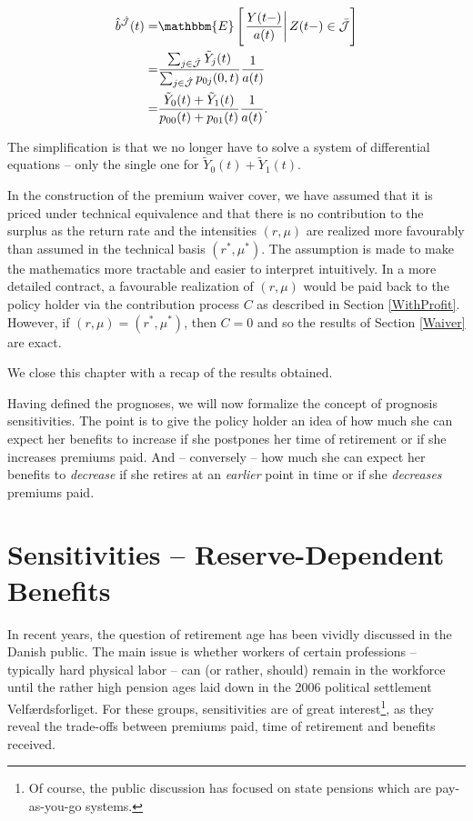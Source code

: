 \documentclass{article}
\newcommand{\1}[1]{\mathbbm{1}_{\left\lbrace #1 \right\rbrace}}
\newcommand{\econd}[2][def]{\mathbbm{E} \left[ \left. #1 \right| #2 \right]}
\theoremstyle{break}
\theoremstyle{remark}
\newenvironment{remark}
  {\pushQED{\qed}\renewcommand{\qedsymbol}{\scalebox{1.4}{$\circ$}}\remarkx}
  {\popQED\endremarkx}
\numberwithin{equation}{section}
\begin{document}
\begin{align*}
	\hat{b}^{\hat{\mathcal{J}}}(t) =& \econd[\frac{Y(t-)}{a(t)}]{Z(t-) \in \bar{\mathcal{J}}} \\
	=&\frac{\sum_{j \in \hat{\mathcal{J}}} \tilde{Y}_j(t)}{\sum_{j \in \hat{\mathcal{J}}} p_{0j}(0,t)} \frac{1}{a(t)} \\
	=&\frac{\tilde{Y}_0(t) + \tilde{Y}_1(t)}{p_{00}(t) + p_{01}(t)} \frac{1}{a(t)}.
\end{align*}

The simplification is that we no longer have to solve a system of differential equations -- only the single one for $\tilde{Y}_0(t) + \tilde{Y}_1(t)$.

\begin{remark}
	In the construction of the premium waiver cover, we have assumed that it is priced under technical equivalence and that there is no contribution to the surplus as the return rate and the intensities $(r,\mu)$ are realized more favourably than assumed in the technical basis $(r^*,\mu^*)$. The assumption is made to make the mathematics more tractable and easier to interpret intuitively. In a more detailed contract, a favourable realization of $(r,\mu)$ would be paid back to the policy holder via the contribution process $C$ as described in Section \ref{WithProfit}. However, if $(r,\mu)=(r^*,\mu^*)$, then $C=0$ and so the results of Section \ref{Waiver} are exact.
\end{remark}

We close this chapter with a recap of the results obtained.

Having defined the prognoses, we will now formalize the concept of prognosis sensitivities. The point is to give the policy holder an idea of how much she can expect her benefits to increase if she postpones her time of retirement or if she increases premiums paid. And -- conversely -- how much she can expect her benefits to \textit{decrease} if she retires at an \textit{earlier} point in time or if she \textit{decreases} premiums paid.

\newpage
\section{Sensitivities -- Reserve-Dependent Benefits}

In recent years, the question of retirement age has been vividly discussed in the Danish public. The main issue is whether workers of certain professions -- typically hard physical labor -- can (or rather, should) remain in the workforce until the rather high pension ages laid down in the 2006 political settlement Velfærdsforliget. For these groups, sensitivities are of great interest\footnote{Of course, the public discussion has focused on state pensions which are pay-as-you-go systems.}, as they reveal the trade-offs between premiums paid, time of retirement and benefits received.
\end{document}
